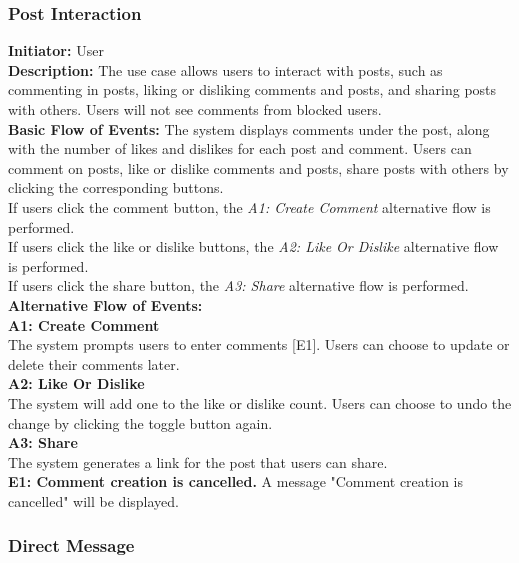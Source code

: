 \documentclass[11pt, a4paper]{article}
\begin{document}
\subsubsection{Post Interaction}

\begin{figure}[H]
    \centering
    
\end{figure}

\textbf{Initiator: }User\\
\textbf{Description: }The use case allows users to interact with posts, such as commenting in posts, liking or disliking comments and posts, and sharing posts with others. Users will not see comments from blocked users.\\
\textbf{Basic Flow of Events: }The system displays comments under the post, along with the number of likes and dislikes for each post and comment. Users can comment on posts, like or dislike comments and posts, share posts with others by clicking the corresponding buttons.\\
If users click the comment button, the \textit{A1: Create Comment} alternative flow is performed.\\
If users click the like or dislike buttons, the \textit{A2: Like Or Dislike} alternative flow is performed.\\
If users click the share button, the \textit{A3: Share} alternative flow is performed.\\
\textbf{Alternative Flow of Events: }\\
\textbf{A1: Create Comment}\\
The system prompts users to enter comments [E1]. Users can choose to update or delete their comments later.\\
\textbf{A2: Like Or Dislike}\\
The system will add one to the like or dislike count. Users can choose to undo the change by clicking the toggle button again.\\
\textbf{A3: Share}\\
The system generates a link for the post that users can share.\\
\textbf{E1: Comment creation is cancelled.} A message "Comment creation is cancelled" will be displayed.\\


\subsubsection{Direct Message}
\end{document}
